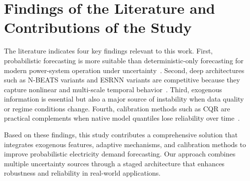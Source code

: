 \section{Findings of the Literature and Contributions of the Study}
\label{sec:gap}

The literature indicates four key findings relevant to this work. First, probabilistic forecasting is more suitable than deterministic-only forecasting for modern power-system operation under uncertainty~\cite{hong2016probabilistic}. Second, deep architectures such as N-BEATS variants and ESRNN variants are competitive because they capture nonlinear and multi-scale temporal behavior~\cite{oreshkin2020nbeats,smyl2025anyquantile}. Third, exogenous information is essential but also a major source of instability when data quality or regime conditions change. Fourth, calibration methods such as CQR are practical complements when native model quantiles lose reliability over time~\cite{romano2019cqr}.

Based on these findings, this study contributes a comprehensive solution that integrates exogenous features, adaptive mechanisms, and calibration methods to improve probabilistic electricity demand forecasting. Our approach combines multiple uncertainty sources through a staged architecture that enhances robustness and reliability in real-world applications.
